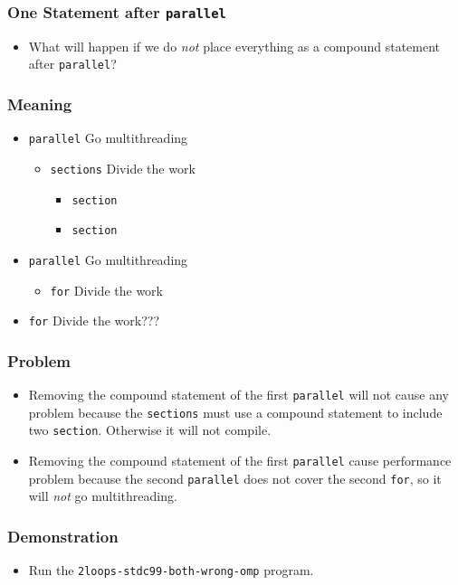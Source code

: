\documentclass{beamer}
\begin{document}
\begin{frame}
  \frametitle{One Statement after {\tt parallel}}
  \begin{itemize}
  \item What will happen if we do {\em not} place everything as a
    compound statement after {\tt parallel}?
  \end{itemize}
\end{frame}



\begin{frame}
\frametitle{Meaning}
\begin{itemize}
\item {\tt parallel} Go multithreading
\begin{itemize} 
\item {\tt sections} Divide the work
\begin{itemize}
\item {\tt section} 
\item {\tt section}
\end{itemize}
\end{itemize}
\item {\tt parallel} Go multithreading
\begin{itemize}
\item {\tt for}  Divide the work
\end{itemize}
\item {\tt for}  Divide the work???
\end{itemize}
\end{frame}

\begin{frame}
\frametitle{Problem}
\begin{itemize}
\item Removing the compound statement of the first {\tt parallel} will
  not cause any problem because the {\tt sections} must use a compound
  statement to include two {\tt section}.  Otherwise it will not
  compile.
\item Removing the compound statement of the first {\tt parallel}
  cause performance problem because the second {\tt parallel} does not
  cover the second {\tt for}, so it will {\em not} go multithreading.
\end{itemize}
\end{frame}


\begin{frame}
  \frametitle{Demonstration}
  \begin{itemize}
  \item Run the {\tt 2loops-stdc99-both-wrong-omp} program.
  \end{itemize}
\end{frame}
\end{document}
